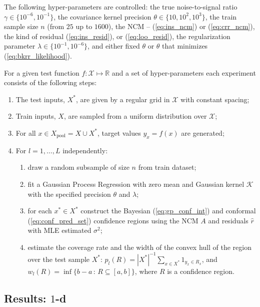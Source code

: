 \documentclass[10pt, conference, compsocconf]{IEEEtran}
\newcommand{\Kcal}{\mathcal{K}}
\newcommand{\Xcal}{\mathcal{X}}
\newcommand{\Real}{\mathbb{R}}
\begin{document}
The following hyper-parameters are controlled: the true noise-to-signal ratio $\gamma
\in \{10^{-6}, 10^{-1}\}$, the covariance kernel precision $\theta \in \{10, 10^2, 10^3\}$,
the train sample size $n$ (from $25$ up to $1600$), the NCM -- (\ref{eq:ins_ncm}) or
(\ref{eq:crr_ncm}), the kind of residual (\ref{eq:ins_resid}), or (\ref{eq:loo_resid}),
the regularization parameter $\lambda \in \{10^{-1}, 10^{-6}\}$, and either fixed
$\theta$ or $\theta$ that minimizes (\ref{eq:bkrr_likelihood}).

For a given test function $f:\Xcal \mapsto \Real$ and a set of hyper-parameters
each experiment consists of the following steps:
\begin{enumerate}
  \item The test inputs, $X^*$, are given by a regular grid in $\Xcal$ with constant
  spacing;
  \item Train inputs, $X$, are sampled from a uniform distribution over $\Xcal$;
  \item For all $x\in X_{\text{pool}} = X \cup X^*$, target values $y_x = f(x)$
  are generated;
  \item For $l=1,\ldots, L$ independently:
  \begin{enumerate}
    \item draw a random subsample of size $n$ from train dataset;
    \item fit a Gaussian Process Regression with zero mean and Gaussian kernel
    $\Kcal$ with the specified precision $\theta$ and $\lambda$;
    \item for each $x^* \in X^*$ construct the Bayesian (\ref{eq:gp_conf_int})
    and conformal (\ref{eq:conf_pred_set}) confidence regions using the NCM $A$
    and residuals $\hat{r}$ with MLE estimated $\sigma^2$;
    \item estimate the coverage rate and the width of the convex hull of the region
    over the test sample $X^*$: $p_l(R) = |X^*|^{-1}\sum_{x\in X^*} 1_{y_x\in R_x}$,
    and $w_l(R) = \inf\{b-a\,:\,R \subseteq [a, b]\}$, where $R$ is a confidence
    region.
  \end{enumerate}
\end{enumerate}

\subsection{Results: $1$-d} %
\label{sub:results_1_d}
\end{document}
